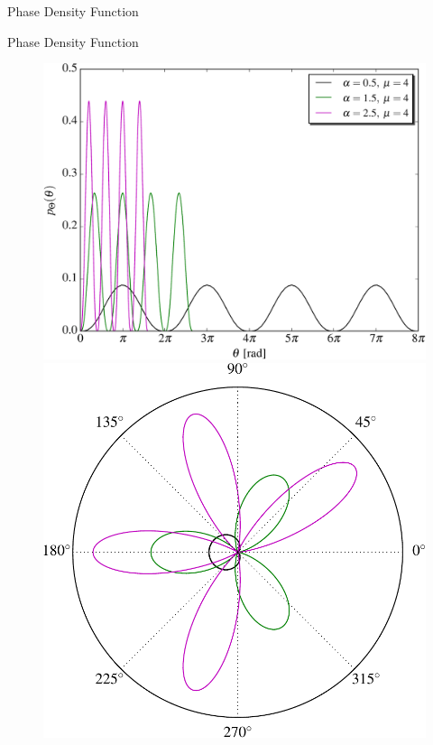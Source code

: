 \documentclass[aspectratio=169]{beamer}
\begin{document}
\begin{frame}[plain]{Phase Density Function}
\begin{figure}
    \end{figure}
\end{frame}

\begin{frame}[plain]{Phase Density Function}
    \begin{center}
    \begin{figure}
        \includegraphics[scale=0.45]{images/phase_fig_2_linear.pdf}
        \includegraphics[scale=0.45]{images/phase_fig_2.pdf}
    \end{figure}
    \end{center}
\end{frame}
\end{document}

